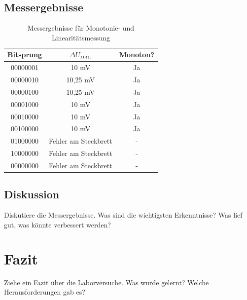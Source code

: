 \documentclass[a4paper,12pt]{article}
\begin{document}
\subsection{Messergebnisse}

\begin{table}[H]
    \centering
    \begin{tabular}{|c|c|c|}
        \hline
        Bitsprung & \( \Delta U_{DAC} \) & Monoton? \\
        \hline
        00000001 & 10 mV & Ja \\
        00000010 & 10,25 mV & Ja \\
        00000100 & 10,25 mV & Ja \\
        00001000 & 10 mV & Ja \\
        00010000 & 10 mV & Ja \\
        00100000 & 10 mV & Ja \\
        01000000 & Fehler am Steckbrett & - \\
        10000000 & Fehler am Steckbrett & - \\
        00000000 & Fehler am Steckbrett & - \\
        \hline
    \end{tabular}
    \caption{Messergebnisse für Monotonie- und Linearitätsmessung}
\end{table}


\subsection{Diskussion}
Diskutiere die Messergebnisse. Was sind die wichtigsten Erkenntnisse? Was lief gut, was könnte verbessert werden?

\section{Fazit}
Ziehe ein Fazit über die Laborversuche. Was wurde gelernt? Welche Herausforderungen gab es?
\end{document}
